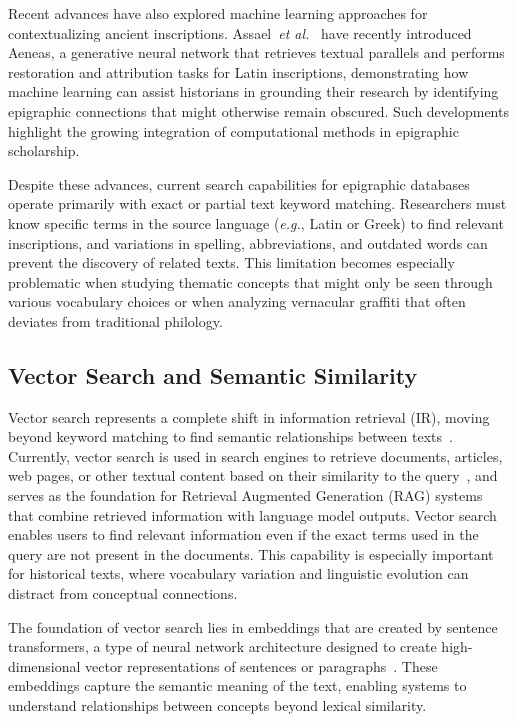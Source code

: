 \documentclass[final,greek,american]{anthology-ch}
\newcommand{\eg}{\textit{e.g.},\xspace}
\newcommand{\etal}{\textit{et al.}\xspace}
\begin{document}
Recent advances have also explored machine learning approaches for contextualizing ancient inscriptions. Assael~\etal~\cite{assael_contextualizing_2025} have recently introduced Aeneas, a generative neural network that retrieves textual parallels and performs restoration and attribution tasks for Latin inscriptions, demonstrating how machine learning
can assist historians in grounding their research by identifying epigraphic connections that might otherwise remain obscured. Such developments highlight the growing integration of computational methods in epigraphic scholarship.

Despite these advances, current search capabilities for epigraphic databases operate primarily with exact or partial text keyword matching.
Researchers must know specific terms in the source language (\eg Latin or Greek) to find relevant inscriptions, and variations in spelling, abbreviations, and outdated words can prevent the discovery of related texts.
This limitation becomes especially problematic when studying thematic concepts that might only be seen through various vocabulary choices or when analyzing vernacular graffiti that often deviates from traditional philology.

\subsection{Vector Search and Semantic Similarity}

Vector search represents a complete shift in information retrieval (IR), moving beyond keyword matching to find semantic relationships between texts~\cite{Monir_VectorSearch_2024}. Currently, vector search is used in search engines to retrieve documents, articles, web pages, or other textual content based on their similarity to the query~\cite{clarke_semantic_2025}, and serves as the foundation for Retrieval Augmented Generation (RAG) systems that combine retrieved information with language model outputs. Vector search enables users to find relevant information even if the exact terms used in the query are not present in the documents. This capability is especially important for historical texts, where vocabulary variation and linguistic evolution can distract from conceptual connections.

The foundation of vector search lies in embeddings that are created by sentence transformers, a type of neural network architecture designed to create high-dimensional vector representations of sentences or paragraphs~\cite{reimers_sentence-bert_2019}. These embeddings capture the semantic meaning of the text, enabling systems to understand relationships between concepts beyond lexical similarity.
\end{document}
